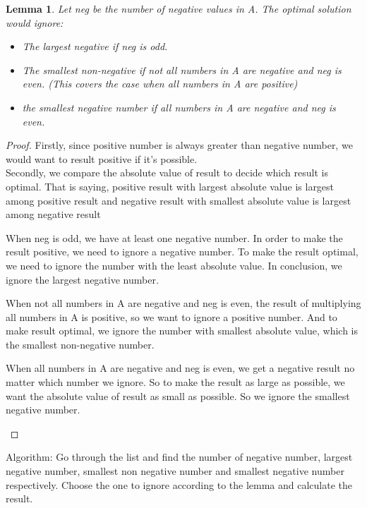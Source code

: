 \documentclass[12pt]{article}
\newtheorem{lemma}{Lemma}
\begin{document}
\begin{lemma}
Let neg be the number of negative values in A. The optimal solution would ignore:\\
\begin{itemize}
 \item The largest negative if neg is odd.
 \item The smallest non-negative if not all numbers in A are negative and neg is even. (This covers the case when all numbers in A are positive)
 \item the smallest negative number if all numbers in A are negative and neg is even.
\end{itemize}
\end{lemma}
\begin{proof} 
Firstly, since positive number is always greater than negative number, we would want to result positive if it's possible. \\
Secondly, we compare the absolute value of result to decide which result is optimal. That is saying, positive result with largest absolute value is largest among positive result and negative result with smallest absolute value is largest among negative result
\begin{description}
\item When neg is odd, we have at least one negative number. In order to make the result positive, we need to ignore a negative number. To make the result optimal, we need to ignore the number with the least absolute value. In conclusion, we ignore the largest negative number.
\item When not all numbers in A are negative and neg is even, the result of multiplying all numbers in A is positive, so we want to ignore a positive number. And to make result optimal, we ignore the number with smallest absolute value, which is the smallest non-negative number.
\item  When all numbers in A are negative and neg is even, we get a negative result no matter which number we ignore. So to make the result as large as possible, we want the absolute value of result as small as possible. So we ignore the smallest negative number.
\end{description}
\end{proof}

Algorithm: Go through the list and find the number of negative number, largest negative number, smallest non negative number and smallest negative number respectively. Choose the one to ignore according to the lemma and calculate the result.\\
\end{document}
